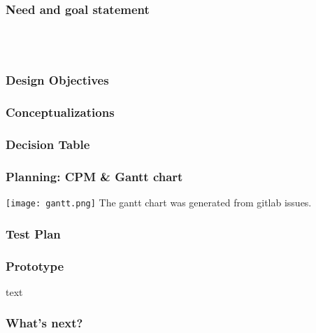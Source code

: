 \documentclass{beamer}
\begin{document}
\frame{\titlepage}

\begin{frame}
  \frametitle{Need and goal statement}
   \\
   \\
\end{frame}

\begin{frame}
  \frametitle{Design Objectives}
  
\end{frame}

\begin{frame}
  \frametitle{Conceptualizations}
  
\end{frame}

\begin{frame}
  \frametitle{Decision Table}
  
\end{frame}

\begin{frame}
  \frametitle{Planning: CPM \& Gantt chart}
  \texttt{[image: gantt.png]}
  The gantt chart was generated from gitlab issues.
\end{frame}

\begin{frame}
  \frametitle{Test Plan}
  
\end{frame}

\begin{frame}
  \frametitle{Prototype}
  text
\end{frame}

\begin{frame}
  \frametitle{What's next?}
\end{frame}
\end{document}
